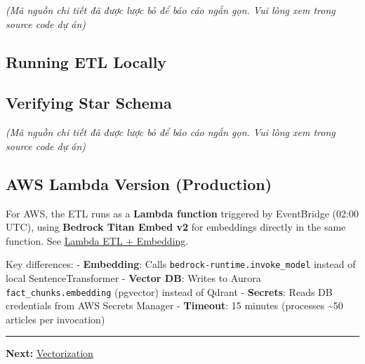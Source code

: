 \emph{(Mã nguồn chi tiết đã được lược bỏ để báo cáo ngắn gọn. Vui lòng
xem trong source code dự án)}

\hypertarget{running-etl-locally}{%
\subsection{Running ETL Locally}}

\begin{Shaded}
\begin{Highlighting}[]

  
\end{Highlighting}
\end{Shaded}

\hypertarget{verifying-star-schema}{%
\subsection{Verifying Star Schema}}

\emph{(Mã nguồn chi tiết đã được lược bỏ để báo cáo ngắn gọn. Vui lòng
xem trong source code dự án)}

\hypertarget{aws-lambda-version-production}{%
\subsection{AWS Lambda Version
(Production)}}

For AWS, the ETL runs as a \textbf{Lambda function} triggered by
EventBridge (02:00 UTC), using \textbf{Bedrock Titan Embed v2} for
embeddings directly in the same function. See
\href{5.12-Lambda-ETL/}{Lambda ETL + Embedding}.

Key differences: - \textbf{Embedding}: Calls
\texttt{bedrock-runtime.invoke\_model} instead of local
SentenceTransformer - \textbf{Vector DB}: Writes to Aurora
\texttt{fact\_chunks.embedding} (pgvector) instead of Qdrant -
\textbf{Secrets}: Reads DB credentials from AWS Secrets Manager -
\textbf{Timeout}: 15 minutes (processes \textasciitilde50 articles per
invocation)

\begin{center}\rule{0.5\linewidth}{0.5pt}\end{center}

\textbf{Next:} \href{5.8-Vectorize/}{Vectorization}
